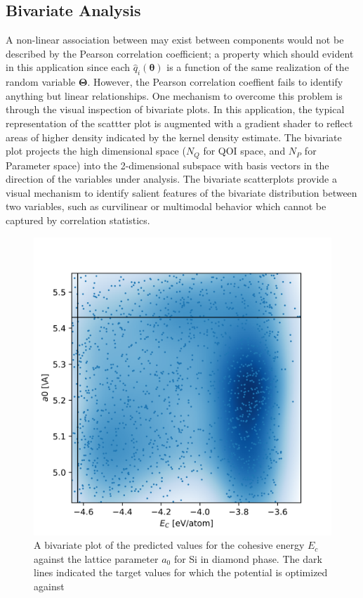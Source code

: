 \subsection{Bivariate Analysis}

A non-linear association between may exist between components would not be described by the Pearson correlation coefficient; a property which should evident in this application since each $\hat{q}_i(\bm{\theta})$ is a function of the same realization of the random variable $\bm{\Theta}$.  However, the Pearson correlation coeffient fails to identify anything but linear relationships.  One mechanism to overcome this problem is through the visual inspection of bivariate plots.  In this application, the typical representation of the scattter plot is augmented with a gradient shader to reflect areas of higher density indicated by the kernel density estimate.  The bivariate plot projects the high dimensional space ($N_Q$ for QOI space, and $N_P$ for Parameter space) into the 2-dimensional subspace with basis vectors in the direction of the variables under analysis.  The bivariate scatterplots provide a visual mechanism to identify salient features of the bivariate distribution between two variables, such as curvilinear or multimodal behavior which cannot be captured by correlation statistics.

\begin{figure}[ht]
  \centering
  \includegraphics[width=5in]{chapter8/qoi_2d_density_plots/Si_dia_E_coh__Si_dia_a0}
  \caption{A bivariate plot of the predicted values for the cohesive energy $E_c$ against the lattice parameter $a_0$ for Si in diamond phase.  The dark lines indicated the target values for which the potential is optimized against}
  \label{fig:Si_Ec_a0_scatterplot}
\end{figure}

